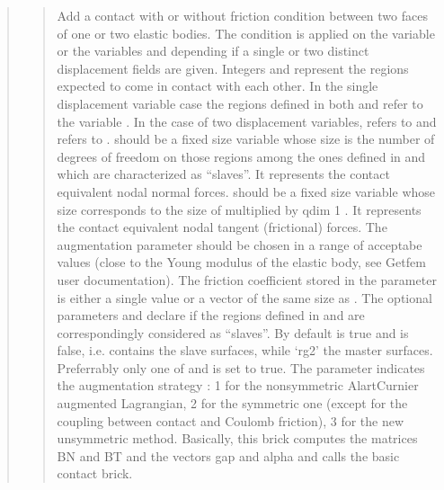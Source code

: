 \documentclass[a4paper,11pt,english]{sphinxmanual}
\begin{document}
\begin{quote}
\begin{quote}
Add a contact with or without friction condition between two faces of
one or two elastic bodies. The condition is applied on the variable
 or the variables  and  depending
if a single or two distinct displacement fields are given. Integers
 and  represent the regions expected to come in contact with
each other. In the single displacement variable case the regions defined
in both  and  refer to the variable . In the case
of two displacement variables,  refers to  and 
refers to .  should be a fixed size variable
whose size is the number of degrees of freedom on those regions among
the ones defined in  and  which are characterized as “slaves”.
It represents the contact equivalent nodal normal forces. 
should be a fixed size variable whose size corresponds to the size of
 multiplied by qdim \sphinxhyphen{} 1 . It represents the contact
equivalent nodal tangent (frictional) forces. The augmentation parameter
 should be chosen in a range of acceptabe values (close to the Young
modulus of the elastic body, see Getfem user documentation). The
friction coefficient stored in the parameter  is either a single
value or a vector of the same size as . The optional
parameters  and  declare if the regions defined in 
and  are correspondingly considered as “slaves”. By default
 is true and  is false, i.e.  contains the slave
surfaces, while ‘rg2’ the master surfaces. Preferrably only one of
 and  is set to true.  The parameter 
indicates the augmentation strategy : 1 for the non\sphinxhyphen{}symmetric
Alart\sphinxhyphen{}Curnier augmented Lagrangian, 2 for the symmetric one (except for
the coupling between contact and Coulomb friction),
3 for the new unsymmetric method.
Basically, this brick computes the matrices BN and BT and the vectors
gap and alpha and calls the basic contact brick.
\end{quote}


\end{quote}
\end{document}
